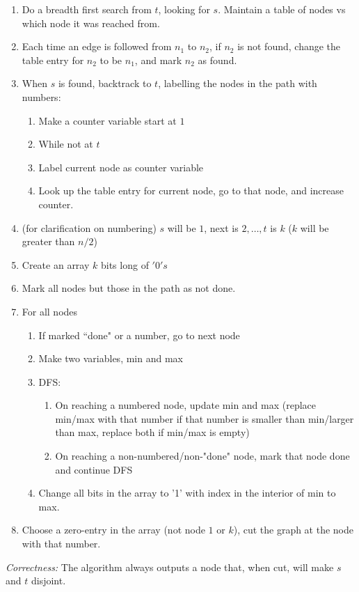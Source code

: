 \documentclass{article}
\begin{document}
\begin{enumerate}
\item Do a breadth first search from $t$, looking for $s$. Maintain a table of nodes vs which node it was reached from.
\item Each time an edge is followed from $n_1$ to $n_2$, if $n_2$ is not found, change the table entry for $n_2$ to be $n_1$, and mark $n_2$ as found.
\item When $s$ is found, backtrack to $t$, labelling the nodes in the path with numbers:
\begin{enumerate}
\item Make a counter variable start at $1$
\item While not at $t$
\item Label current node as counter variable
\item Look up the table entry for current node, go to that node, and increase counter.
\end{enumerate}
\item (for clarification on numbering) $s$ will be $1$, next is $2, \dots, t$ is $k$ ($k$ will be greater than $n/2$)
\item Create an array $k$ bits long of $'0's$
\item Mark all nodes but those in the path as not done.
\item For all nodes
\begin{enumerate}
\item If marked ``done" or a number, go to next node
\item Make two variables, min and max
\item DFS:
\begin{enumerate}\item On reaching a numbered node, update min and max (replace min/max with that number if that number is smaller than min/larger than max, replace both if min/max is empty)
\item On reaching a non-numbered/non-"done" node, mark that node done and continue DFS
\end{enumerate}
\item Change all bits in the array to '1' with index in the interior of min to max.
\end{enumerate}
\item Choose a zero-entry in the array (not node $1$ or $k$), cut the graph at the node with that number.
\end{enumerate}


\emph{Correctness:} The algorithm always outputs a node that, when cut, will make $s$ and $t$ disjoint.
\end{document}
